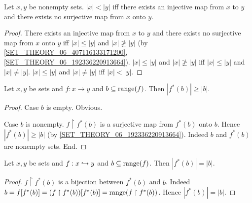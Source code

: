 \documentclass[10pt]{article}
\begin{document}
  \begin{forthel}
    \begin{proposition}
      Let $x, y$ be nonempty sets.
      $|x| < |y|$ iff there exists an injective map from $x$ to $y$ and there
      exists no surjective map from $x$ onto $y$.
    \end{proposition}
    \begin{proof}
      There exists an injective map from $x$ to $y$ and there exists no
      surjective map from $x$ onto $y$ iff $|x| \leq |y|$ and $|x| \ngeq |y|$
      (by \cref{SET_THEORY_06_407116133171200},
      \cref{SET_THEORY_06_192336220913664}).
      $|x| \leq |y|$ and $|x| \ngeq |y|$ iff $|x| \leq |y|$ and $|x| \neq |y|$.
      $|x| \leq |y|$ and $|x| \neq |y|$ iff $|x| < |y|$.
    \end{proof}
  \end{forthel}

  \begin{forthel}
    \begin{proposition}
      Let $x, y$ be sets and $f : x \to y$ and $b \subseteq \textrm{range}(f)$.
      Then $|f^{*}(b)| \geq |b|$.
    \end{proposition}
    \begin{proof}
      Case $b$ is empty. Obvious.

      Case $b$ is nonempty.
        $f \restriction f^{*}(b)$ is a surjective map from $f^{*}(b)$ onto $b$.
        Hence $|f^{*}(b)| \geq |b|$ (by \cref{SET_THEORY_06_192336220913664}).
        Indeed $b$ and $f^{*}(b)$ are nonempty sets.
      End.
    \end{proof}
  \end{forthel}

  \begin{forthel}
    \begin{proposition}
      Let $x, y$ be sets and $f : x \hookrightarrow y$ and $b \subseteq \textrm{range}(f)$.
      Then $|f^{*}(b)| = |b|$.
    \end{proposition}
    \begin{proof}
      $f \restriction f^{*}(b)$ is a bijection between $f^{*}(b)$ and $b$.
      Indeed $b
        = f[f^{*}(b)]
        = (f \restriction f^{*}(b))[f^{*}(b)]
        = \textrm{range}(f \restriction f^{*}(b))$.
      Hence $|f^{*}(b)| = |b|$.
    \end{proof}
  \end{forthel}
\end{document}
